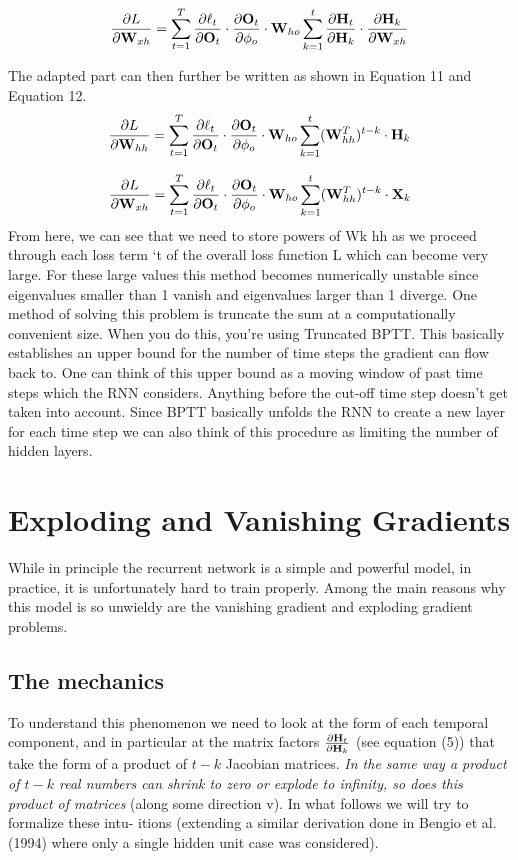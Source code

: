 \documentclass{article}
\begin{document}
\begin{equation}
  \pdv{L}{\mathbf{W}_{xh}} = \sum_{t=1}^T \pdv{\ell_t}{\mathbf{O}_t} \cdot \pdv{\mathbf{O}_t}{\phi_o} \cdot \mathbf{W}_{ho} \sum_{k=1}^t \pdv{\mathbf{H}_t}{\mathbf{H}_k} \cdot \pdv{\mathbf{H}_k}{\mathbf{W}_{xh}}
\end{equation}

The adapted part can then further be written as shown in Equation 11 and Equation 12.
\begin{equation}
  \pdv{L}{\mathbf{W}_{hh}} = \sum_{t=1}^T \pdv{\ell_t}{\mathbf{O}_t} \cdot \pdv{\mathbf{O}_t}{\phi_o} \cdot \mathbf{W}_{ho} \sum_{k=1}^t (\mathbf{W}_{hh}^T)^{t-k} \cdot \mathbf{H}_k
\end{equation}

\begin{equation}
  \pdv{L}{\mathbf{W}_{xh}} = \sum_{t=1}^T \pdv{\ell_t}{\mathbf{O}_t} \cdot \pdv{\mathbf{O}_t}{\phi_o} \cdot \mathbf{W}_{ho} \sum_{k=1}^t (\mathbf{W}_{hh}^T)^{t-k} \cdot \mathbf{X}_k
\end{equation}
From here, we can see that we need to store powers of Wk
hh as we proceed through each loss term
`t of the overall loss function L which can become very large. For these large values this method
becomes numerically unstable since eigenvalues smaller than 1 vanish and eigenvalues larger than 1
diverge. One method of solving this problem is truncate the sum at a computationally convenient
size. When you do this, you're using Truncated BPTT. This basically establishes an upper
bound for the number of time steps the gradient can flow back to. One can think of this upper
bound as a moving window of past time steps which the RNN considers. Anything before the cut-off
time step doesn't get taken into account. Since BPTT basically unfolds the RNN to create a new layer
for each time step we can also think of this procedure as limiting the number of hidden layers.

\section{Exploding and Vanishing Gradients}
While in principle the recurrent network is a simple
and powerful model, in practice, it is unfortunately
hard to train properly. Among the main reasons why
this model is so unwieldy are the vanishing gradient and exploding gradient problems.
\subsection{The mechanics}
To understand this phenomenon we need to look at the
form of each temporal component, and in particular at
the matrix factors $\pdv{\mathbf{H}_t}{\mathbf{H}_k}$ (see equation (5)) that take the
form of a product of $t-k$ Jacobian matrices. \textit{In the
same way a product of $t-k$ real numbers can shrink
to zero or explode to infinity, so does this product of
matrices} (along some direction v).
In what follows we will try to formalize these intu-
itions (extending a similar derivation done in Bengio
et al. (1994) where only a single hidden unit case was
considered).
\end{document}
